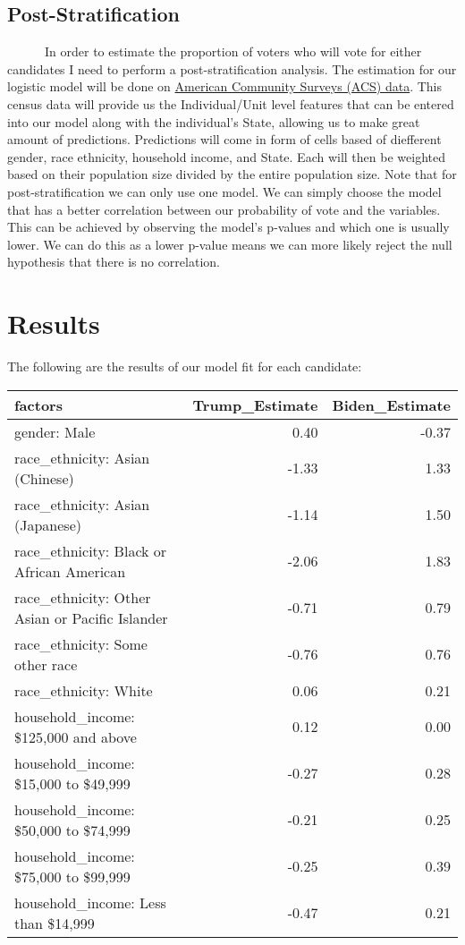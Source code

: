 \documentclass[
]{article}
\begin{document}
\hypertarget{post-stratification}{%
\subsection{Post-Stratification}\label{post-stratification}}

~~~~~~In order to estimate the proportion of voters who will vote for
either candidates I need to perform a post-stratification analysis. The
estimation for our logistic model will be done on
\href{https://usa.ipums.org/usa/index.shtml}{American Community Surveys
(ACS) data}. This census data will provide us the Individual/Unit level
features that can be entered into our model along with the individual's
State, allowing us to make great amount of predictions. Predictions will
come in form of cells based of diefferent gender, race ethnicity,
household income, and State. Each will then be weighted based on their
population size divided by the entire population size. Note that for
post-stratification we can only use one model. We can simply choose the
model that has a better correlation between our probability of vote and
the variables. This can be achieved by observing the model's p-values
and which one is usually lower. We can do this as a lower p-value means
we can more likely reject the null hypothesis that there is no
correlation.

\hypertarget{results}{%
\section{Results}\label{results}}

The following are the results of our model fit for each candidate:

\begin{longtable}[]{@{}lrr@{}}
\toprule
factors & Trump\_Estimate & Biden\_Estimate\tabularnewline
\midrule
\endhead
gender: Male & 0.40 & -0.37\tabularnewline
race\_ethnicity: Asian (Chinese) & -1.33 & 1.33\tabularnewline
race\_ethnicity: Asian (Japanese) & -1.14 & 1.50\tabularnewline
race\_ethnicity: Black or African American & -2.06 & 1.83\tabularnewline
race\_ethnicity: Other Asian or Pacific Islander & -0.71 &
0.79\tabularnewline
race\_ethnicity: Some other race & -0.76 & 0.76\tabularnewline
race\_ethnicity: White & 0.06 & 0.21\tabularnewline
household\_income: \$125,000 and above & 0.12 & 0.00\tabularnewline
household\_income: \$15,000 to \$49,999 & -0.27 & 0.28\tabularnewline
household\_income: \$50,000 to \$74,999 & -0.21 & 0.25\tabularnewline
household\_income: \$75,000 to \$99,999 & -0.25 & 0.39\tabularnewline
household\_income: Less than \$14,999 & -0.47 & 0.21\tabularnewline
\bottomrule
\end{longtable}
\end{document}
